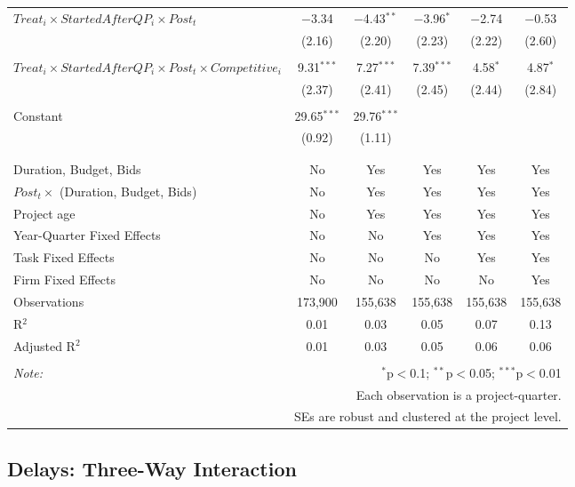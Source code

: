 \documentclass[
]{article}
\begin{document}
\begin{table}[H]
\begin{tabular}{@{\extracolsep{-2pt}}lccccc}
 $Treat_i \times StartedAfterQP_i \times Post_t$ & $-$3.34 & $-$4.43$^{**}$ & $-$3.96$^{*}$ & $-$2.74 & $-$0.53 \\ 
  & (2.16) & (2.20) & (2.23) & (2.22) & (2.60) \\ 
  & & & & & \\ 
 $Treat_i \times StartedAfterQP_i \times Post_t \times Competitive_i$ & 9.31$^{***}$ & 7.27$^{***}$ & 7.39$^{***}$ & 4.58$^{*}$ & 4.87$^{*}$ \\ 
  & (2.37) & (2.41) & (2.45) & (2.44) & (2.84) \\ 
  & & & & & \\ 
 Constant & 29.65$^{***}$ & 29.76$^{***}$ &  &  &  \\ 
  & (0.92) & (1.11) &  &  &  \\ 
  & & & & & \\ 
\hline \\[-1.8ex] 
Duration, Budget, Bids & No & Yes & Yes & Yes & Yes \\ 
$Post_t \times $  (Duration, Budget, Bids) & No & Yes & Yes & Yes & Yes \\ 
Project age & No & Yes & Yes & Yes & Yes \\ 
Year-Quarter Fixed Effects & No & No & Yes & Yes & Yes \\ 
Task Fixed Effects & No & No & No & Yes & Yes \\ 
Firm Fixed Effects & No & No & No & No & Yes \\ 
Observations & 173,900 & 155,638 & 155,638 & 155,638 & 155,638 \\ 
R$^{2}$ & 0.01 & 0.03 & 0.05 & 0.07 & 0.13 \\ 
Adjusted R$^{2}$ & 0.01 & 0.03 & 0.05 & 0.06 & 0.06 \\ 
\hline 
\hline \\[-1.8ex] 
\textit{Note:}  & \multicolumn{5}{r}{$^{*}$p$<$0.1; $^{**}$p$<$0.05; $^{***}$p$<$0.01} \\ 
 & \multicolumn{5}{r}{Each observation is a project-quarter.} \\ 
 & \multicolumn{5}{r}{SEs are robust and clustered at the project level.} \\ 
\end{tabular} 
\end{table}

\hypertarget{delays-three-way-interaction}{%
\subsection{Delays: Three-Way
Interaction}\label{delays-three-way-interaction}}
\end{document}
